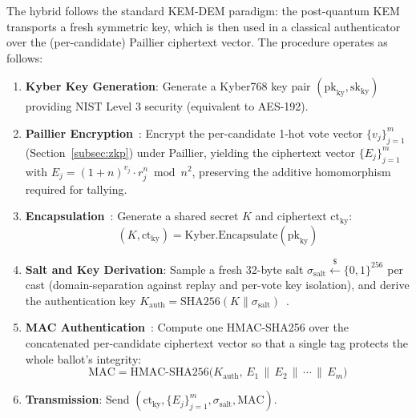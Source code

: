 The hybrid follows the standard KEM-DEM paradigm: the post-quantum KEM transports a fresh symmetric key, which is then used in a classical authenticator over the (per-candidate) Paillier ciphertext vector. The procedure operates as follows:
\begin{enumerate}
    \item \textbf{Kyber Key Generation}: Generate a Kyber768 key pair $(\text{pk}_{\text{ky}}, \text{sk}_{\text{ky}})$ providing NIST Level 3 security (equivalent to AES-192).
    \item \textbf{Paillier Encryption}~\cite{paillier1999}: Encrypt the per-candidate 1-hot vote vector $\{v_j\}_{j=1}^{m}$ (Section~\ref{subsec:zkp}) under Paillier, yielding the ciphertext vector $\{E_j\}_{j=1}^{m}$ with $E_j = (1+n)^{v_j} \cdot r_j^{n} \bmod n^2$, preserving the additive homomorphism required for tallying.
    \item \textbf{Encapsulation}~\cite{nist_kyber}: Generate a shared secret $K$ and ciphertext $\text{ct}_{\text{ky}}$:
    \begin{equation}
        (K, \text{ct}_{\text{ky}}) = \text{Kyber.Encapsulate}(\text{pk}_{\text{ky}})
    \end{equation}
    \item \textbf{Salt and Key Derivation}: Sample a fresh 32-byte salt $\sigma_{\text{salt}} \xleftarrow{\$} \{0,1\}^{256}$ per cast (domain-separation against replay and per-vote key isolation), and derive the authentication key $K_{\text{auth}} = \text{SHA256}(K \| \sigma_{\text{salt}})$~\cite{nist_fips180_4}.
    \item \textbf{MAC Authentication}~\cite{rfc2104,nist_fips198}: Compute one HMAC-SHA256 over the concatenated per-candidate ciphertext vector so that a single tag protects the whole ballot's integrity:
    \begin{equation}
        \text{MAC} = \text{HMAC-SHA256}\bigl(K_{\text{auth}},\, E_1 \,\|\, E_2 \,\|\, \cdots \,\|\, E_m\bigr)
    \end{equation}
    \item \textbf{Transmission}: Send $(\text{ct}_{\text{ky}}, \{E_j\}_{j=1}^{m}, \sigma_{\text{salt}}, \text{MAC})$.
\end{enumerate}

